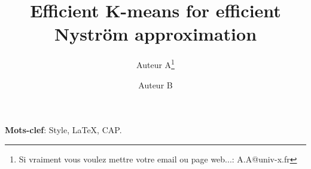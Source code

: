 \documentclass[twocolumn]{article}
\title{Efficient K-means for efficient Nyström approximation}
\author[1]{Auteur A\thanks{Si vraiment vous voulez mettre votre email
    ou page web...: A.A@univ-x.fr}}
\author[2]{Auteur B}
\affil[1]{Université X, CNRS}
\affil[2]{Université Y, CNRS et INRIA}
\begin{document}
\maketitle



\medskip

\noindent\textbf{Mots-clef}: Style, \LaTeX, CAP.










\end{document}
